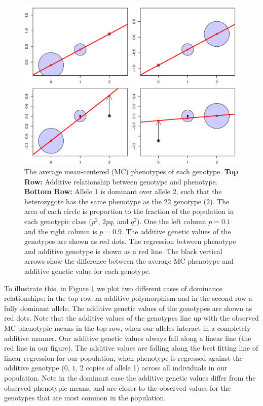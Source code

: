 \begin{figure}
\begin{center}
\includegraphics[width=\textwidth]{figures/additive_effect.pdf}
\end{center}
\caption{The average mean-centered (MC) phenotypes of each genotype. 
{\bf Top Row:} Additive relationship between genotype and phenotype. 
{\bf Bottom Row:} Allele 1 is dominant over allele 2, such that the
heterozygote has the same phenotype as the $22$ genotype ($2$). 
The area of each circle is proportion to the fraction of
the population in each genotypic class ($p^2$, $2pq$, and $q^2$). 
One the left column $p=0.1$ and the right column is $p=0.9$.
The additive genetic values of the genotypes are shown as
  red dots. The regression between phenotype and additive genotype is
  shown as a red line. The black vertical arrows show the difference
between the average MC phenotype and additive genetic value for each genotype. } \label{fig:add_dom}
\end{figure}


To illustrate this, in Figure \ref{fig:add_dom} we plot two different cases of dominance
relationships; in the top row an additive polymorphism and in the second
row a fully dominant allele. The additive genetic values of the genotypes are shown as red dots. Note that the additive values of the genotypes line up with
the observed MC phenotypic means in the top row, when our alleles interact in a
completely additive manner. Our additive genetic values always fall along a
linear line (the red line in our figure). The additive values are falling along the best
fitting line of linear regression for our population, when phenotype is
regressed against the additive genotype ($0$, $1$, $2$ copies of allele 1)
across all individuals in our population. Note in the dominant case the
additive genetic values differ from the observed phenotypic means, and are
closer to the observed values for the genotypes that are most common in the
population. \\

